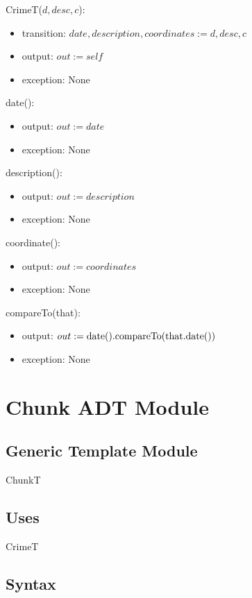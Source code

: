 \documentclass[12pt]{article}
\begin{document}
CrimeT($d, desc, c$):
\begin{itemize}
\item transition: $date, description, coordinates := d, desc, c$
\item output: $out := \mathit{self}$
\item exception: None
\end{itemize}

\noindent date():
\begin{itemize}
\item output: $out := date$
\item exception: None
\end{itemize}

\noindent description():
\begin{itemize}
\item output: $out := description$
\item exception: None
\end{itemize}

\noindent coordinate():
\begin{itemize}
\item output: $out := coordinates$
\item exception: None
\end{itemize}

\noindent compareTo(that):
\begin{itemize}
\item output: $out := \textnormal{date().compareTo(that.date())}$
\item exception: None
\end{itemize}

\newpage

\section* {Chunk ADT Module}

\subsection* {Generic Template Module}

ChunkT

\subsection* {Uses}

CrimeT

\subsection* {Syntax}
\end{document}
